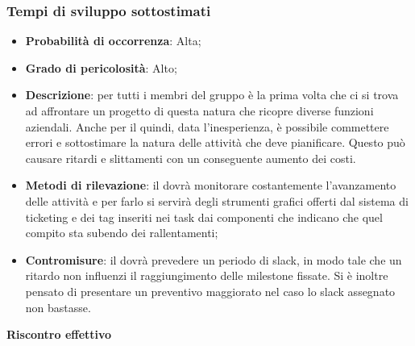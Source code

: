 		\subsubsection{Tempi di sviluppo sottostimati} %
		\label{ssub:tempi_di_sviluppo_sottostimati}
			\begin{itemize}
				\item \textbf{Probabilità di occorrenza}: Alta;
				\item \textbf{Grado di pericolosità}: Alto;
				\item \textbf{Descrizione}: per tutti i membri del gruppo è la prima volta che ci si trova ad affrontare un progetto di questa natura che ricopre diverse funzioni aziendali. Anche per il \roleProjectManager{} quindi, data l'inesperienza, è possibile commettere errori e sottostimare la natura delle attività che deve pianificare. Questo può causare ritardi e slittamenti con un conseguente aumento dei costi.
				\item \textbf{Metodi di rilevazione}: il \roleProjectManager{} dovrà monitorare costantemente l'avanzamento delle attività e per farlo si servirà degli strumenti grafici offerti dal sistema di ticketing e dei tag inseriti nei task dai componenti che indicano che quel compito sta subendo dei rallentamenti;
				\item \textbf{Contromisure}: il \roleProjectManager{} dovrà prevedere un periodo di slack, in modo tale che un ritardo non influenzi il raggiungimento delle milestone fissate. Si è inoltre pensato di presentare un preventivo maggiorato nel caso lo slack assegnato non bastasse.
			\end{itemize}
		\noindent
		\textbf{Riscontro effettivo}

